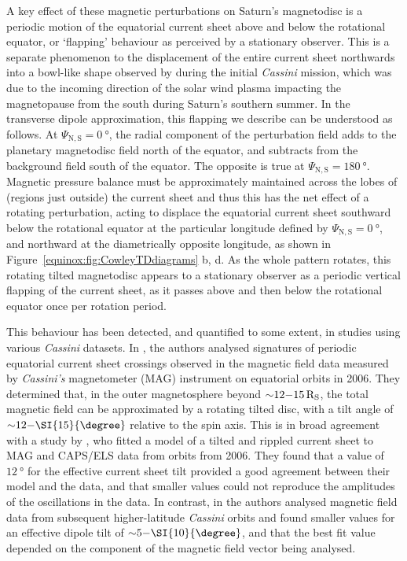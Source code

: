 A key effect of these magnetic perturbations on Saturn's magnetodisc is a periodic motion of the equatorial current sheet above and below the rotational equator, or `flapping' behaviour as perceived by a stationary observer. This is a separate phenomenon to the displacement of the entire current sheet northwards into a bowl-like shape observed by \citet{arridge2008warp} during the initial \textit{Cassini} mission, which was due to the incoming direction of the solar wind plasma impacting the magnetopause from the south during Saturn's southern summer. In the transverse dipole approximation, this flapping we describe can be understood as follows. At $\Psi_\mathrm{N,S} = \SI{0}{\degree}$, the radial component of the perturbation field adds to the planetary magnetodisc field north of the equator, and subtracts from the background field south of the equator. The opposite is true at $\Psi_\mathrm{N,S} = \SI{180}{\degree}$. Magnetic pressure balance must be approximately maintained across the lobes of (regions just outside) the current sheet and thus this has the net effect of a rotating perturbation, acting to displace the equatorial current sheet southward below the rotational equator at the particular longitude defined by $\Psi_\mathrm{N,S} = \SI{0}{\degree}$, and northward at the diametrically opposite longitude, as shown in Figure~\ref{equinox:fig:CowleyTDdiagrams} b, d. As the whole pattern rotates, this rotating tilted magnetodisc appears to a stationary observer as a periodic vertical flapping of the current sheet, as it passes above and then below the rotational equator once per rotation period. 

This behaviour has been detected, and quantified to some extent, in studies using various \textit{Cassini} datasets. In \citet{southwood2007}, the authors analysed signatures of periodic equatorial current sheet crossings observed in the magnetic field data measured by \textit{Cassini's} magnetometer (MAG) instrument on equatorial orbits in 2006. They determined that, in the outer magnetosphere beyond ${\sim}12{\--}\SI{15}{R_S}$, the total magnetic field can be approximated by a rotating tilted disc, with a tilt angle of ${\sim}12{\--}\SI{15}{\degree}$ relative to the spin axis. This is in broad agreement with a study by \citet{arridge2011}, who fitted a model of a tilted and rippled current sheet to MAG and CAPS/ELS data from orbits from 2006. They found that a value of $\SI{12}{\degree}$ for the effective current sheet tilt provided a good agreement between their model and the data, and that smaller values could not reproduce the amplitudes of the oscillations in the data. In contrast, in \citet{provan2009} the authors analysed magnetic field data from subsequent higher-latitude \textit{Cassini} orbits and found smaller values for an effective dipole tilt of ${\sim}5{\--}\SI{10}{\degree}$, and that the best fit value depended on the component of the magnetic field vector being analysed. 

